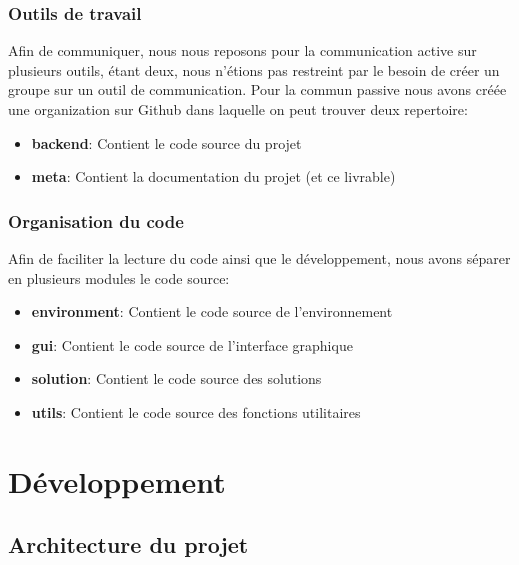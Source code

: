 \documentclass[french,a4paper,10pt,twocolumn]{article}
\begin{document}
\subsubsection{Outils de travail}

Afin de communiquer, nous nous reposons pour la communication active sur plusieurs outils, étant deux,
nous n'étions pas restreint par le besoin de créer un groupe sur un outil de communication.
Pour la commun passive nous avons créée une organization sur Github dans laquelle on peut trouver deux repertoire:
\begin{itemize}
    \item \textbf{backend}: Contient le code source du projet
    \item \textbf{meta}: Contient la documentation du projet (et ce livrable)
\end{itemize}

\subsubsection{Organisation du code}

Afin de faciliter la lecture du code ainsi que le développement, nous avons séparer en plusieurs modules le code source:
\begin{itemize}
    \item \textbf{environment}: Contient le code source de l'environnement
    \item \textbf{gui}: Contient le code source de l'interface graphique
    \item \textbf{solution}: Contient le code source des solutions
    \item \textbf{utils}: Contient le code source des fonctions utilitaires
\end{itemize}



\section{Développement}

\subsection{Architecture du projet}
\end{document}
